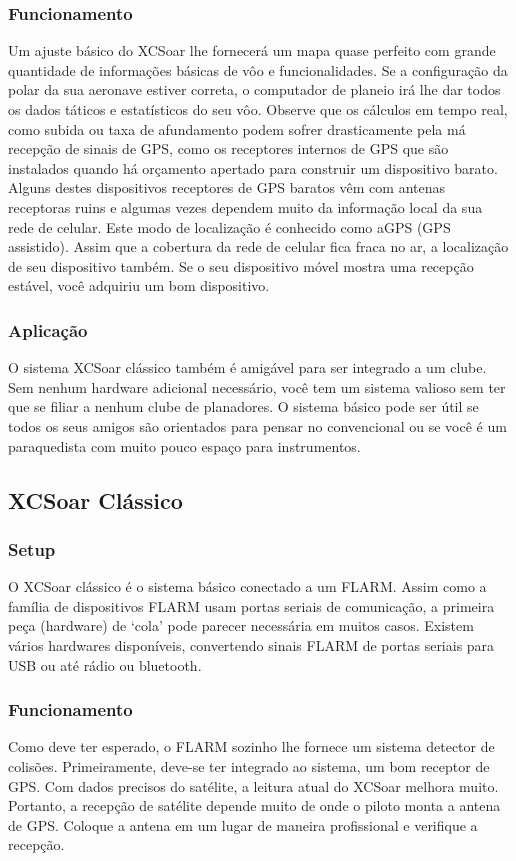 \subsubsection*{Funcionamento} Um ajuste básico do XCSoar lhe fornecerá um mapa quase perfeito com grande quantidade de informações básicas de vôo e funcionalidades. Se a configuração da polar da sua aeronave estiver correta, o computador de planeio irá lhe dar todos os dados táticos e estatísticos do seu vôo.  Observe que os cálculos em tempo real, como subida ou taxa de afundamento podem sofrer drasticamente pela má recepção de sinais de GPS, como os receptores internos de GPS que são instalados quando há orçamento apertado para construir um dispositivo barato.  Alguns destes dispositivos receptores de GPS baratos vêm com antenas receptoras ruins e algumas vezes dependem muito da informação local da sua rede de celular.  Este modo de localização é conhecido como aGPS (GPS assistido).  Assim que a cobertura da rede de celular fica fraca no ar, a localização de seu dispositivo também.  Se o seu dispositivo móvel mostra uma recepção estável, você adquiriu um bom dispositivo.

\subsubsection*{Aplicação} O sistema XCSoar clássico também é amigável para ser integrado a um clube.  Sem nenhum hardware adicional necessário, você tem um sistema valioso sem ter que se filiar a nenhum clube de planadores.  O sistema básico pode ser útil se todos os seus amigos são orientados para pensar no convencional ou se você é um paraquedista com muito pouco espaço para instrumentos.  

\subsection*{XCSoar Clássico}
\subsubsection*{Setup} O XCSoar clássico é o sistema básico conectado a um FLARM.  Assim como a família de dispositivos FLARM usam portas seriais de comunicação, a primeira peça (hardware) de ‘cola’ pode parecer necessária em muitos casos.  Existem vários hardwares disponíveis, convertendo sinais FLARM de portas seriais para USB ou até rádio ou bluetooth.

\subsubsection*{Funcionamento} Como deve ter esperado, o FLARM sozinho lhe fornece um sistema detector de colisões.  Primeiramente, deve-se ter integrado ao sistema, um bom receptor de GPS.  Com dados precisos do satélite, a leitura atual do XCSoar melhora muito.  Portanto, a recepção de satélite depende muito de onde o piloto monta a antena de GPS.  Coloque a antena em um lugar de maneira profissional e verifique a recepção.

